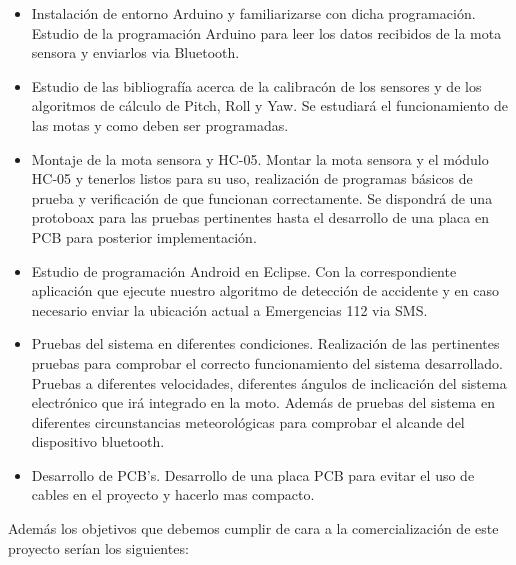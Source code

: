 		\begin{itemize}
			\item Instalaci\'on de entorno Arduino y familiarizarse con dicha programaci\'on. Estudio de la programaci\'on Arduino para leer los datos recibidos de la mota sensora y enviarlos via Bluetooth.
			
			\item Estudio de las bibliograf\'ia acerca de la calibrac\'on de los sensores y de los algoritmos de c\'alculo de Pitch, Roll y Yaw. Se estudiar\'a el funcionamiento de las motas y como deben ser programadas.
			
			\item Montaje de la mota sensora y HC-05. Montar la mota sensora y el m\'odulo HC-05 y tenerlos listos para su uso, realizaci\'on de programas b\'asicos de prueba y verificaci\'on de que funcionan correctamente. Se dispondr\'a de una protoboax para las pruebas pertinentes hasta el desarrollo de una placa en PCB para posterior implementaci\'on.
			
			\item Estudio de programaci\'on Android en Eclipse. Con la correspondiente aplicaci\'on que ejecute nuestro algoritmo de detecci\'on de accidente y en caso necesario enviar la ubicaci\'on actual a Emergencias 112 via SMS.
			
			\item Pruebas del sistema en diferentes condiciones. Realizaci\'on de las pertinentes pruebas para comprobar el correcto funcionamiento del sistema desarrollado. Pruebas a diferentes velocidades, diferentes \'angulos de inclicaci\'on del sistema electr\'onico que ir\'a integrado en la moto. Adem\'as de pruebas del sistema en diferentes circunstancias meteorol\'ogicas para comprobar el alcande del dispositivo bluetooth.
			
			\item Desarrollo de PCB's. Desarrollo de una placa PCB para evitar el uso de cables en el proyecto y hacerlo mas compacto.
			
		\end{itemize}
		
		Adem\'as los objetivos que debemos cumplir de cara a la comercializaci\'on de este proyecto ser\'ian los siguientes:
		
